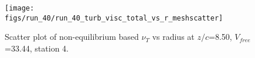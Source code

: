 \begin{figure}[H]
\centering
\texttt{[image: figs/run\_40/run\_40\_turb\_visc\_total\_vs\_r\_meshscatter]}
\caption{Scatter plot of non-equilibrium based $\nu_T$ vs radius at $z/c$=8.50, $V_{free}$=33.44, station 4.}
\label{fig:run_40_turb_visc_total_vs_r_meshscatter}
\end{figure}


